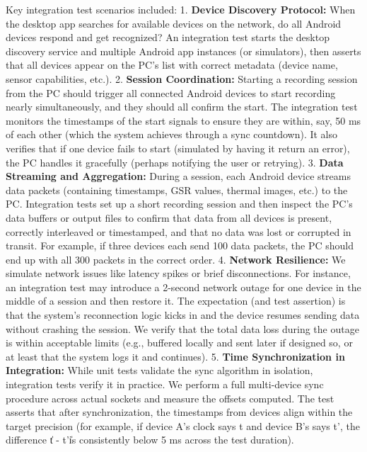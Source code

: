 Key integration test scenarios included: 1. \textbf{Device Discovery
Protocol:} When the desktop app searches for available devices on the
network, do all Android devices respond and get recognized? An
integration test starts the desktop discovery service and multiple
Android app instances (or simulators), then asserts that all devices
appear on the PC's list with correct metadata (device name, sensor
capabilities, etc.). 2. \textbf{Session Coordination:} Starting a recording
session from the PC should trigger all connected Android devices to
start recording nearly simultaneously, and they should all confirm the
start. The integration test monitors the timestamps of the start signals
to ensure they are within, say, 50 ms of each other (which the system
achieves through a sync countdown). It also verifies that if one device
fails to start (simulated by having it return an error), the PC handles
it gracefully (perhaps notifying the user or retrying). 3. \textbf{Data
Streaming and Aggregation:} During a session, each Android device
streams data packets (containing timestamps, GSR values, thermal images,
etc.) to the PC. Integration tests set up a short recording session and
then inspect the PC's data buffers or output files to confirm that data
from all devices is present, correctly interleaved or timestamped, and
that no data was lost or corrupted in transit. For example, if three
devices each send 100 data packets, the PC should end up with all 300
packets in the correct order. 4. \textbf{Network Resilience:} We simulate
network issues like latency spikes or brief disconnections. For
instance, an integration test may introduce a 2-second network outage
for one device in the middle of a session and then restore it. The
expectation (and test assertion) is that the system's reconnection logic
kicks in and the device resumes sending data without crashing the
session. We verify that the total data loss during the outage is within
acceptable limits (e.g., buffered locally and sent later if designed so,
or at least that the system logs it and continues). 5. \textbf{Time
Synchronization in Integration:} While unit tests validate the sync
algorithm in isolation, integration tests verify it in practice. We
perform a full multi-device sync procedure across actual sockets and
measure the offsets computed. The test asserts that after
synchronization, the timestamps from devices align within the target
precision (for example, if device A's clock says t and device B's says
t', the difference \|t - t'\| is consistently below 5 ms across the
test duration).

